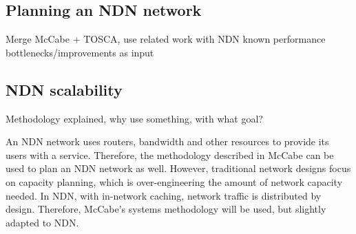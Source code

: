 







\subsection{Planning an NDN network}
\label{method-planning}

Merge McCabe + TOSCA, use related work with NDN known performance bottlenecks/improvements as input

\subsection{NDN scalability}
Methodology explained, why use something, with what goal?

An NDN network uses routers, bandwidth and other resources to provide its users with a service. Therefore, the methodology described in McCabe can be used to plan an NDN network as well. However, traditional network designs focus on capacity planning, which is over-engineering the amount of network capacity needed. In NDN, with in-network caching, network traffic is distributed by design. Therefore, McCabe's systems methodology will be used, but slightly adapted to NDN. 